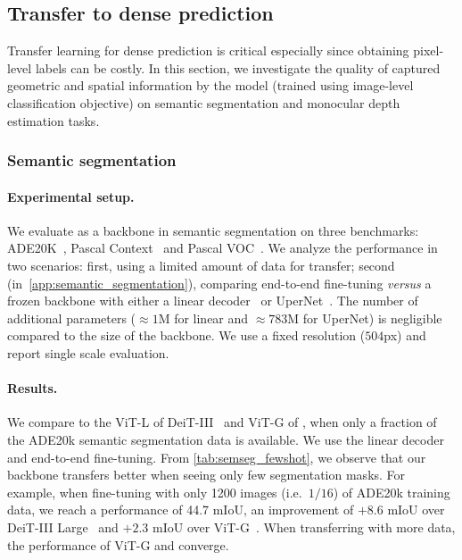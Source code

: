 \subsection{Transfer to dense prediction}
Transfer learning for dense prediction is critical especially since obtaining pixel-level labels can be costly. In this section, we investigate the quality of captured geometric and spatial information by the \chonk model (trained using image-level classification objective) on semantic segmentation and monocular depth estimation tasks.


\subsubsection{Semantic segmentation}
\paragraph{Experimental setup.}
We evaluate \chonk as a backbone in semantic segmentation on three benchmarks: ADE20K~\citep{zhou2017scene}, Pascal Context~\citep{mottaghi2014role} and Pascal VOC~\citep{everingham2010pascal}.
We analyze the performance in two scenarios:
first, using a limited amount of data for transfer;
second (in~\cref{app:semantic_segmentation}), comparing end-to-end fine-tuning \textit{versus} a frozen backbone with either a linear decoder~\citep{strudel2021segmenter} or UperNet~\citep{xiao2018unified}.
The number of additional parameters ($\approx1$M for linear and $\approx783$M for UperNet) is negligible compared to the size of the backbone. We use a fixed resolution ($504$px) and report single scale evaluation.

\paragraph{Results.}
We compare \chonk to the ViT-L of DeiT-III~\citep{touvron2022deit} and ViT-G of \citet{zhai2022scaling}, when only a fraction of the ADE20k semantic segmentation data is available. %
We use the linear decoder and end-to-end fine-tuning.
From \cref{tab:semseg_fewshot}, we observe that our \chonk backbone transfers better when seeing only few segmentation masks.
For example, when fine-tuning with only 1200 images (i.e.\ $1/16$) of ADE20k training data, we reach a performance of 44.7 mIoU, an improvement of $+8.6$ mIoU over DeiT-III Large~\citep{touvron2022deit} and $+2.3$ mIoU over ViT-G~\citep{zhai2022scaling}.
When transferring with more data, the performance of ViT-G and \chonk converge.

